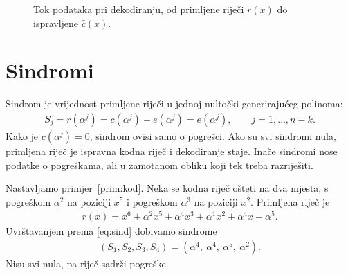 \documentclass{mathos}
\begin{document}
\begin{figure}[hbtp]
\centering
{}
\caption{Tok podataka pri dekodiranju, od primljene riječi $r(x)$ do ispravljene $\hat c(x)$.}
\label{fig:pipeline}
\end{figure}

\section{Sindromi}

Sindrom je vrijednost primljene riječi u jednoj nultočki generirajućeg polinoma:
\begin{align}\label{eq:sind}
    S_j = r(\alpha^j) = c(\alpha^j) + e(\alpha^j) = e(\alpha^j), \qquad j = 1, \dots, n-k.
\end{align}
Kako je $c(\alpha^j) = 0$, sindrom ovisi samo o pogrešci. Ako su svi sindromi nula, primljena riječ je ispravna kodna riječ i dekodiranje staje. Inače sindromi nose podatke o pogreškama, ali u zamotanom obliku koji tek treba razriješiti.

\begin{primjer}\label{prim:sind}
Nastavljamo primjer~\ref{prim:kod}. Neka se kodna riječ ošteti na dva mjesta, s pogreškom $\alpha^2$ na poziciji $x^5$ i pogreškom $\alpha^3$ na poziciji $x^2$. Primljena riječ je
\begin{align*}
    r(x) = x^6 + \alpha^2 x^5 + \alpha^4 x^3 + \alpha^1 x^2 + \alpha^4 x + \alpha^5.
\end{align*}
Uvrštavanjem prema \eqref{eq:sind} dobivamo sindrome
\begin{align*}
    (S_1, S_2, S_3, S_4) = (\alpha^4,\ \alpha^4,\ \alpha^5,\ \alpha^2).
\end{align*}
Nisu svi nula, pa riječ sadrži pogreške.
\end{primjer}
\end{document}
